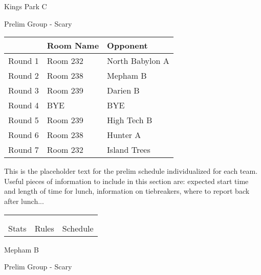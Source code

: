 \documentclass{article}%
\begin{document}
\newpage%
%
\begin{center}%
\begin{Huge}%
Kings Park C%
\end{Huge}%
\vspace*{12pt}%
\linebreak%
\begin{Large}%
Prelim Group {-} Scary%
\end{Large}%
\end{center}%
\vspace*{4pt}%
\begin{tabularx}{\textwidth}{|c|Y|Y|}%
\hline%
&Room Name&Opponent\\%
\hline%
Round 1&Room 232&North Babylon A\\%
Round 2&Room 238&Mepham B\\%
Round 3&Room 239&Darien B\\%
Round 4&BYE&BYE\\%
Round 5&Room 239&High Tech B\\%
Round 6&Room 238&Hunter A\\%
Round 7&Room 232&Island Trees\\%
\hline%
\end{tabularx}%
\vspace*{30pt}%
\linebreak%
This is the placeholder text for the prelim schedule individualized for each team. Useful pieces of information to include in this section are: expected start time and length of time for lunch, information on tiebreakers, where to report back after lunch...%
\vspace*{30pt}%
\newline%
%
\begin{tabularx}{\textwidth}{YYY}%
  &  &  \\%
\\%
Stats&Rules&Schedule\\%
\end{tabularx}%
\newpage%
%
\begin{center}%
\begin{Huge}%
Mepham B%
\end{Huge}%
\vspace*{12pt}%
\linebreak%
\begin{Large}%
Prelim Group {-} Scary%
\end{Large}%
\end{center}%
\end{document}
